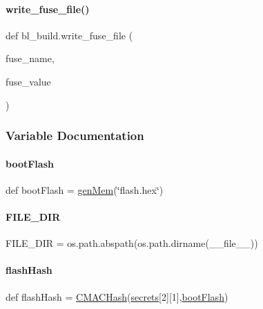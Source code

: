 \paragraph{\texorpdfstring{write\+\_\+fuse\+\_\+file()}{write\_fuse\_file()}}
{\footnotesize\ttfamily def bl\+\_\+build.\+write\+\_\+fuse\+\_\+file (\begin{DoxyParamCaption}\item[{}]{fuse\+\_\+name,  }\item[{}]{fuse\+\_\+value }\end{DoxyParamCaption})}



\subsubsection{Variable Documentation}
\mbox{\label{namespacebl__build_a25673c001dbceb6755931c1b27cb1bb2}} 
\paragraph{\texorpdfstring{boot\+Flash}{bootFlash}}
{\footnotesize\ttfamily def boot\+Flash = \hyperlink{namespacebl__build_a8dc8ae3d67a3c82b7c54bc26252467bd}{gen\+Mem}(\char`\"{}flash.\+hex\char`\"{})}

\mbox{\label{namespacebl__build_a089c1667c30c72cb05807dd8157b9ff9}} 
\paragraph{\texorpdfstring{F\+I\+L\+E\+\_\+\+D\+IR}{FILE\_DIR}}
{\footnotesize\ttfamily F\+I\+L\+E\+\_\+\+D\+IR = os.\+path.\+abspath(os.\+path.\+dirname(\+\_\+\+\_\+file\+\_\+\+\_\+))}

\mbox{\label{namespacebl__build_ab62730e5e3b453486f9cbb5630497604}} 
\paragraph{\texorpdfstring{flash\+Hash}{flashHash}}
{\footnotesize\ttfamily def flash\+Hash = \hyperlink{namespacebl__build_a097a5019a83d65ad61254db9a76624eb}{C\+M\+A\+C\+Hash}(\hyperlink{namespacebl__build_a7ef58b6350bb8f1ea4b81d24cac72a55}{secrets}\mbox{[}2\mbox{]}\mbox{[}1\mbox{]},\hyperlink{namespacebl__build_a25673c001dbceb6755931c1b27cb1bb2}{boot\+Flash})}

